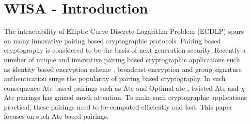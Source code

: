 \section{WISA - Introduction}
The intractability of Elliptic Curve Discrete Logarithm Problem (ECDLP) spurs on many innovative pairing based cryptographic protocols.
Pairing based cryptography is considered to be the basis of next generation security. 
Recently a number of unique and innovative pairing based cryptographic applications such as identity based encryption scheme \cite{C:BonFra01}, broadcast encryption \cite{C:BonGenWat05} and group signature authentication \cite{C:BonBoySha04} surge the popularity of pairing based cryptography. 
In such consequence Ate-based pairings such as Ate \cite{DBLP:reference/crc/2005ehcc} and Optimal-ate \cite{DBLP:journals/tit/Vercauteren10}, twisted Ate  \cite{EPRINT:MKHO07} and $\chi$-Ate \cite{PAIRING:NASKM08} pairings has gained much attention. 
To make such cryptographic applications practical, these pairings need to be computed efficiently and fast. 
This paper focuses on such  Ate-based pairings. 

